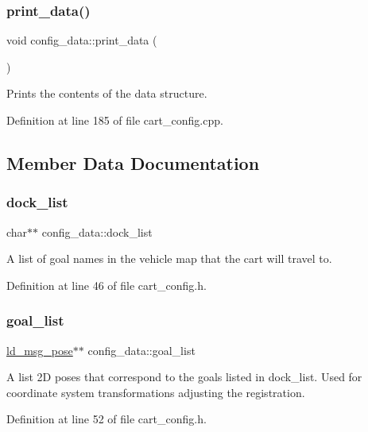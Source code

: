 \subsubsection{\texorpdfstring{print\+\_\+data()}{print\_data()}}
{\footnotesize\ttfamily void config\+\_\+data\+::print\+\_\+data (\begin{DoxyParamCaption}{ }\end{DoxyParamCaption})}

Prints the contents of the data structure. 

Definition at line 185 of file cart\+\_\+config.\+cpp.



\subsection{Member Data Documentation}
\mbox{\label{structconfig__data_a07fc464b6e930d7ff7f843cd4f4fe2dd}} 
\subsubsection{\texorpdfstring{dock\+\_\+list}{dock\_list}}
{\footnotesize\ttfamily char$\ast$$\ast$ config\+\_\+data\+::dock\+\_\+list}

A list of goal names in the vehicle map that the cart will travel to. 

Definition at line 46 of file cart\+\_\+config.\+h.

\mbox{\label{structconfig__data_ad5378ccb37d95d996823422eee9dc9fc}} 
\subsubsection{\texorpdfstring{goal\+\_\+list}{goal\_list}}
{\footnotesize\ttfamily \mbox{\hyperlink{structld__msg__pose}{ld\+\_\+msg\+\_\+pose}}$\ast$$\ast$ config\+\_\+data\+::goal\+\_\+list}

A list 2D poses that correspond to the goals listed in dock\+\_\+list. Used for coordinate system transformations adjusting the registration. 

Definition at line 52 of file cart\+\_\+config.\+h.

